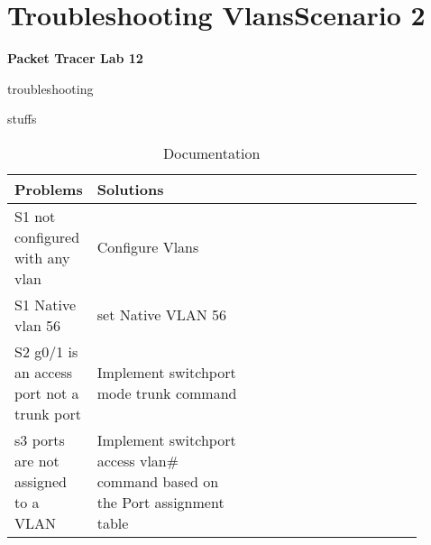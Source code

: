 \documentclass[../EngineeringJournal_CDavis.tex]{subfiles}
\begin{document}

\chapter[Troubleshooting Vlans Scenario 2]{Troubleshooting Vlans\linebreak[1]
Scenario 2 \hspace*{\fill March 2, 2020}}
\noindent\textbf{{Packet Tracer Lab 12} }                             


\hspace{0.2cm}
\begin{tcolorbox}[width=6.3in]
\scriptsize 
troubleshooting
  \begin{outline}
    \1 stuffs
  \end{outline}
\end{tcolorbox}
\hspace{0.2cm}
\normalsize  
  
\clearpage


\begin{table}[!h]
  \caption{Documentation}
  \label{tab:Doc12}
  \begin{tabular}{lp{0.45\linewidth}| lp{0.45\linewidth}p{1in}}
    \textbf{Problems} & \textbf{Solutions}\\\hline
    S1 not configured with any vlan & Configure Vlans\\
    S1 Native vlan 56 & set Native VLAN 56\\
    S2 g0/1 is an access port not a trunk port & Implement switchport mode trunk command\\
    s3 ports are not assigned to a VLAN & Implement switchport access vlan\#
    command based on the Port assignment table\\
  \end{tabular}
\end{table}
\end{document}
